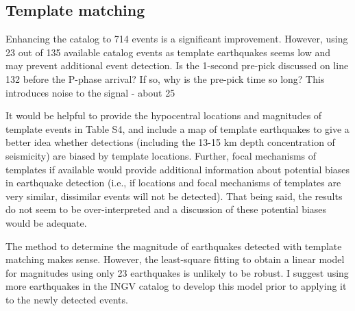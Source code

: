 \documentclass[10pt]{extarticle}
\begin{document}
\subsection*{Template matching}

\begin{ReviewerComment}{1}
\noindent 
Enhancing the catalog to 714 events is a significant improvement. However, using 23 out of 135 available catalog events as template earthquakes seems low and may prevent additional event detection. Is the 1-second pre-pick discussed on line 132 before the P-phase arrival? If so, why is the pre-pick time so long? This introduces noise to the signal - about 25%

\end{ReviewerComment}


\begin{Answer}
 \WorkInProgressRevTask
\end{Answer}
%
%



\begin{ReviewerComment}{1}
\noindent 
It would be helpful to provide the hypocentral locations and magnitudes of template events in Table S4, and include a map of template earthquakes to give a better idea whether detections (including the 13-15 km depth concentration of seismicity) are biased by template locations. Further, focal mechanisms of templates if available would provide additional information about potential biases in earthquake detection (i.e., if locations and focal mechanisms of templates are very similar, dissimilar events will not be detected). That being said, the results do not seem to be over-interpreted and a discussion of these potential biases would be adequate.

\end{ReviewerComment}


\begin{Answer}
 \WorkInProgressRevTask
\end{Answer}
%
%



\begin{ReviewerComment}{1}
\noindent 
The method to determine the magnitude of earthquakes detected with template matching makes sense. However, the least-square fitting to obtain a linear model for magnitudes using only 23 earthquakes is unlikely to be robust. I suggest using more earthquakes in the INGV catalog to develop this model prior to applying it to the newly detected events.

\end{ReviewerComment}
\end{document}
